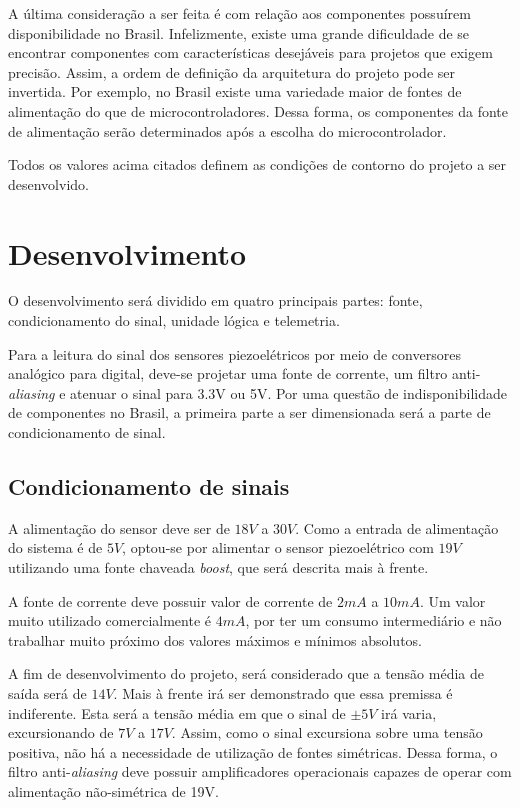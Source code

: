 \documentclass[11pt]{abntex2}
\begin{document}
			A última consideração a ser feita é com relação aos componentes
			possuírem disponibilidade no Brasil. Infelizmente, existe uma grande
			dificuldade de se encontrar componentes com características
			desejáveis para projetos que exigem precisão. Assim, a ordem de
			definição da arquitetura do projeto pode ser invertida. Por exemplo,
			no Brasil existe uma variedade maior de fontes de alimentação do que
			de microcontroladores. Dessa forma, os componentes da fonte de
			alimentação serão determinados após a escolha do microcontrolador.
			
			Todos os valores acima citados definem as condições de contorno do
			projeto a ser desenvolvido.

	\chapter{Desenvolvimento}

		O desenvolvimento será dividido em quatro principais partes: fonte,
		condicionamento do sinal, unidade lógica e telemetria.

		Para a leitura do sinal dos sensores piezoelétricos por meio de
		conversores analógico para digital, deve-se projetar uma fonte de
		corrente, um filtro anti-\textit{aliasing} e atenuar o sinal para 3.3V ou 5V. Por
		uma questão de indisponibilidade de componentes no Brasil, a primeira
		parte a ser dimensionada será a parte de condicionamento de sinal.
	
		\section{Condicionamento de sinais}

			A alimentação do sensor deve ser de $18V$ a $30V$. Como a entrada de
			alimentação do sistema é de $5V$, optou-se por alimentar o sensor
			piezoelétrico com $19V$ utilizando uma fonte chaveada \textit{boost}, que será
			descrita mais à frente.

			A fonte de corrente deve possuir valor de corrente de $2mA$ a $10mA$. Um valor muito
			utilizado comercialmente é $4mA$, por ter um consumo intermediário e não trabalhar
			muito próximo dos valores máximos e mínimos absolutos.

			A fim de desenvolvimento do projeto, será considerado que a tensão
			média de saída será de $14V$. Mais à frente irá ser demonstrado que
			essa premissa é indiferente. Esta será a tensão média em que o sinal
			de $\pm 5V$ irá varia, excursionando de $7V$ a $17V$. Assim, como o
			sinal excursiona sobre uma tensão positiva, não há a necessidade de
			utilização de fontes simétricas. Dessa forma, o filtro
			anti-\textit{aliasing} deve possuir amplificadores operacionais
			capazes de operar com alimentação não-simétrica de 19V.
\end{document}
